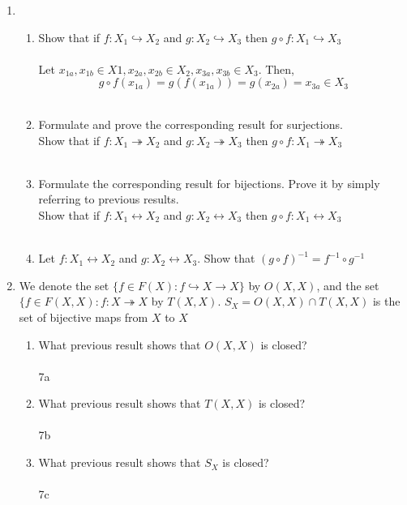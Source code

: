 \documentclass[11pt]{article}
\begin{document}
\begin{enumerate}
\newpage
\item
\begin{enumerate}
\item Show that if $f :X_1 \hookrightarrow X_2$ and $g :X_2 \hookrightarrow X_3$ then $g \circ f: X_1 \hookrightarrow X_3$\\\\
Let $x_{1a},x_{1b} \in X1, x_{2a},x_{2b} \in X_2, x_{3a},x_{3b} \in X_3$.  Then,\\
$$g \circ f(x_{1a}) = g(f(x_{1a})) = g(x_{2a}) = x_{3a} \in X_3$$
\\

\item Formulate and prove the corresponding result for surjections.\\
Show that if $f :X_1 \twoheadrightarrow X_2$ and $g :X_2 \twoheadrightarrow X_3$ then $g \circ f: X_1 \twoheadrightarrow X_3$\\\\
\item Formulate the corresponding result for bijections. Prove it by simply referring to previous results.\\
Show that if $f :X_1 \leftrightarrow X_2$ and $g :X_2 \leftrightarrow X_3$ then $g \circ f: X_1 \leftrightarrow X_3$\\\\
\item Let $f :X_1 \leftrightarrow X_2$ and $g :X_2 \leftrightarrow X_3$.  Show that $(g \circ f)^{-1} = f^{-1} \circ g^{-1}$\\
\end{enumerate}


\newpage
\item We denote the set $\{f \in F(X) : f \hookrightarrow X \to X\}$ by $O(X, X)$, and the set $\{f \in F(X, X) : f : X \twoheadrightarrow X$ by $T(X, X)$.  $S_X = O(X,X) \cap T(X,X)$ is the set of bijective maps from $X$ to $X$
\begin{enumerate}
\item What previous result shows that $O(X, X)$ is closed?\\\\
7a
\item What previous result shows that $T(X, X)$ is closed?\\\\
7b
\item What previous result shows that $S_X$ is closed?\\\\
7c
\end{enumerate}


\end{enumerate}
\end{document}
